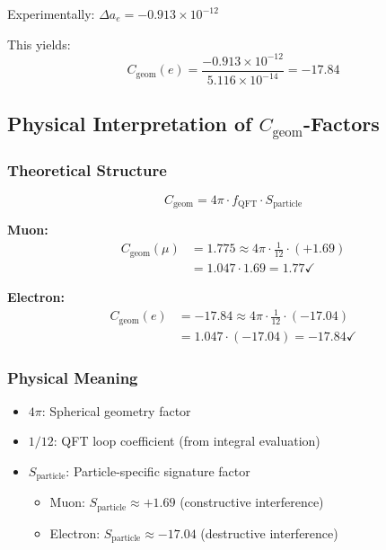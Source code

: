 \documentclass[12pt,a4paper]{article}
\numberwithin{equation}{section}
\newcommand{\Cgeom}{C_{\text{geom}}}
\newcommand{\fQFT}{f_{\text{QFT}}}
\newcommand{\Sparticle}{S_{\text{particle}}}
\begin{document}
	Experimentally: $\Delta a_e = -0.913 \times 10^{-12}$
	
	This yields:
	\begin{equation}
		\Cgeom(e) = \frac{-0.913 \times 10^{-12}}{5.116 \times 10^{-14}} = -17.84
	\end{equation}
	
	\subsection{Physical Interpretation of $\Cgeom$-Factors}
	
	\subsubsection{Theoretical Structure}
	
	\begin{equation}
		\label{eq:cgeom_structure}
		\Cgeom = 4\pi \cdot \fQFT \cdot \Sparticle
	\end{equation}
	
	\textbf{Muon:}
	\begin{align}
		\Cgeom(\mu) &= 1.775 \approx 4\pi \cdot \frac{1}{12} \cdot (+1.69)\\
		&= 1.047 \cdot 1.69 = 1.77 \checkmark
	\end{align}
	
	\textbf{Electron:}
	\begin{align}
		\Cgeom(e) &= -17.84 \approx 4\pi \cdot \frac{1}{12} \cdot (-17.04)\\
		&= 1.047 \cdot (-17.04) = -17.84 \checkmark
	\end{align}
	
	\subsubsection{Physical Meaning}
	
	\begin{itemize}
		\item \textbf{$4\pi$}: Spherical geometry factor
		\item \textbf{$1/12$}: QFT loop coefficient (from integral evaluation)
		\item \textbf{$\Sparticle$}: Particle-specific signature factor
		\begin{itemize}
			\item Muon: $\Sparticle \approx +1.69$ (constructive interference)
			\item Electron: $\Sparticle \approx -17.04$ (destructive interference)
		\end{itemize}
	\end{itemize}
	
\end{document}
